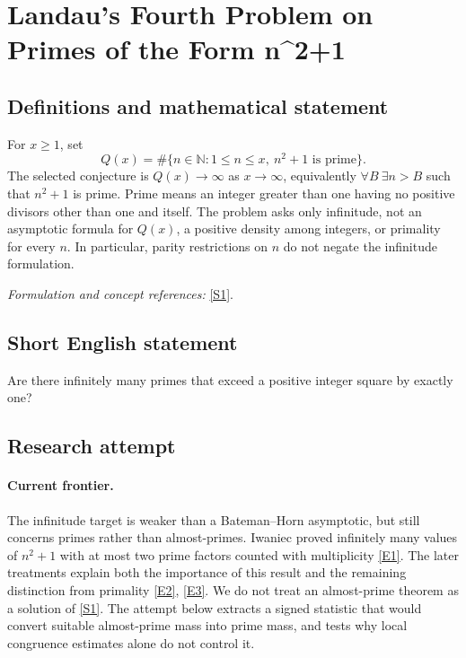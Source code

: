 \documentclass[11pt,a4paper]{article}
\newcommand{\N}{\mathbb{N}}
\newcommand{\sref}[2]{\hyperlink{source:#1:#2}{[S#2]}}
\newcommand{\eref}[2]{\hyperlink{extra:#1:#2}{[E#2]}}
\newif\ifshowcatalogue
\newcommand{\cataloguescope}[1]{\ifshowcatalogue
 \paragraph{Exact scope in the supplied catalogue.}
 \begin{quote}\small #1\end{quote}\fi}
\numberwithin{equation}{section}
\begin{document}
\setcounter{section}{189}
\clearpage
\section{\texorpdfstring{Landau's Fourth Problem on Primes of the Form n\textasciicircum{}2+1}{Landau's Fourth Problem on Primes of the Form n\textasciicircum{}2+1}}\label{190}
\subsection{Definitions and mathematical statement}
For $x\ge1$, set
\[
 Q(x)=\#\{n\in\N:1\le n\le x,\ n^2+1\text{ is prime}\}.
\]
The selected conjecture is $Q(x)\to\infty$ as $x\to\infty$, equivalently
$\forall B\ \exists n>B$ such that $n^2+1$ is prime. Prime means an integer greater than one having no positive divisors other than one and itself. The problem asks only infinitude, not an asymptotic formula for $Q(x)$, a positive density among integers, or primality for every $n$. In particular, parity restrictions on $n$ do not negate the infinitude formulation.
\par\smallskip\textit{Formulation and concept references:} \sref{190}{1}.
\cataloguescope{Prove or disprove that there are infinitely many primes of the form n\textasciicircum{}2+1 with n a positive integer.}
\subsection{Short English statement}
Are there infinitely many primes that exceed a positive integer square by exactly one?
\subsection{Research attempt}

\paragraph{Current frontier.}
The infinitude target is weaker than a Bateman--Horn asymptotic, but still concerns primes rather than almost-primes. Iwaniec proved infinitely many values of $n^2+1$ with at most two prime factors counted with multiplicity \eref{190}{1}. The later treatments explain both the importance of this result and the remaining distinction from primality \eref{190}{2}, \eref{190}{3}. We do not treat an almost-prime theorem as a solution of \sref{190}{1}. The attempt below extracts a signed statistic that would convert suitable almost-prime mass into prime mass, and tests why local congruence estimates alone do not control it.
\end{document}
